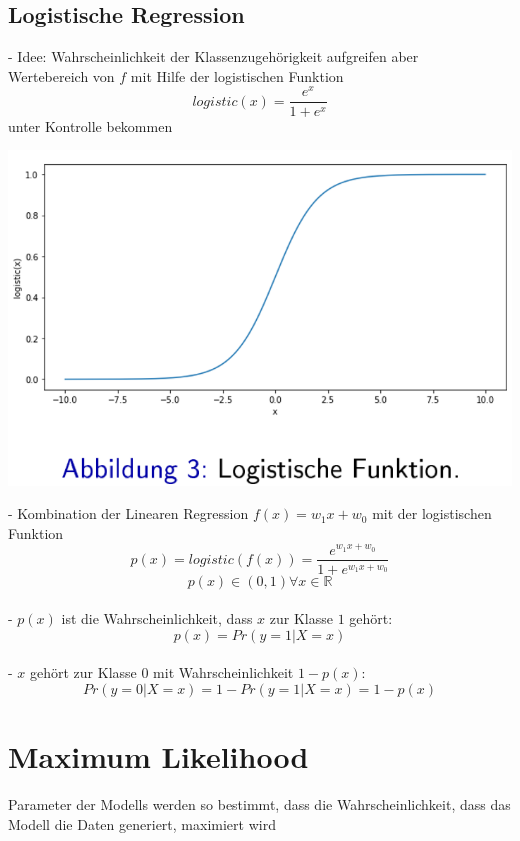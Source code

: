 \documentclass{report}
\begin{document}
  \subsection{Logistische Regression}	
  - Idee: Wahrscheinlichkeit der Klassenzugehörigkeit aufgreifen aber\\	
  Wertebereich von $f$ mit Hilfe der logistischen Funktion	
  $$logistic(x) = \frac{e^x}{1 + e^x}$$	
  unter Kontrolle bekommen	
  \begin{center}	
    \includegraphics[scale=.3]{ml03_2}	
  \end{center}	
  - Kombination der Linearen Regression $f(x) = w_1x + w_0$ mit der logistischen Funktion	
  $$p(x) = logistic(f(x)) = \frac{e^{w_1x + w_0}}{1 + e^{w_1x + w_0}}$$	
  $$p(x) \in (0, 1) \forall x \in \mathbb{R}$$\\	
  - $p(x)$ ist die Wahrscheinlichkeit, dass $x$ zur Klasse $1$ gehört:\\	
  $$p(x) = Pr(y = 1 | X = x)$$\\	
  - $x$ gehört zur Klasse $0$ mit Wahrscheinlichkeit $1 - p(x)$:\\	
  $$Pr(y = 0|X = x) = 1 - Pr(y = 1 | X = x) = 1 - p(x)$$	
  
  \section{Maximum Likelihood}	
  Parameter der Modells werden so bestimmt, dass die Wahrscheinlichkeit, dass das Modell die Daten generiert, maximiert wird\\	
  
\end{document}
